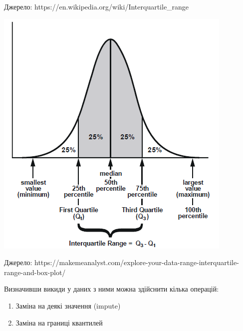 \documentclass[
  letterpaper,
  DIV=11,
  numbers=noendperiod]{scrreprt}
\newenvironment{Shaded}{\begin{snugshade}}{\end{snugshade}}
\newcommand{\FloatTok}[1]{\textcolor[rgb]{0.68,0.00,0.00}{#1}}
\newcommand{\FunctionTok}[1]{\textcolor[rgb]{0.28,0.35,0.67}{#1}}
\newcommand{\NormalTok}[1]{\textcolor[rgb]{0.00,0.23,0.31}{#1}}
\newcommand{\OtherTok}[1]{\textcolor[rgb]{0.00,0.23,0.31}{#1}}
\newcommand{\SpecialCharTok}[1]{\textcolor[rgb]{0.37,0.37,0.37}{#1}}
\providecommand{\tightlist}{%
  \setlength{\itemsep}{0pt}\setlength{\parskip}{0pt}}\usepackage{longtable,booktabs,array}
\begin{document}
Джерело: https://en.wikipedia.org/wiki/Interquartile\_range

\includegraphics{img/da-data-cleaning/quantiles2.png}

Джерело:
https://makemeanalyst.com/explore-your-data-range-interquartile-range-and-box-plot/

Визначивши викиди у даних з ними можна здійснити кілька операцій:

\begin{enumerate}
\def\labelenumi{\arabic{enumi}.}
\tightlist
\item
  Заміна на деякі значення (impute)
\item
  Заміна на границі квантилей
\end{enumerate}

\begin{Shaded}
\end{Shaded}
\end{document}
